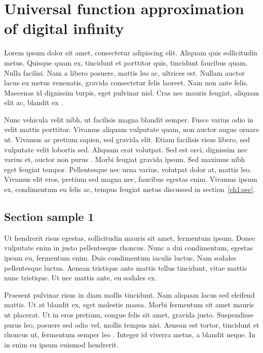 \chapter{Universal function approximation of digital infinity}

Lorem ipsum dolor sit amet, consectetur adipiscing elit. Aliquam quis sollicitudin metus. Quisque quam ex, tincidunt et porttitor quis, tincidunt faucibus quam. Nulla facilisi. Nam a libero posuere, mattis leo ac, ultrices est. Nullam auctor lacus eu metus venenatis, gravida consectetur felis laoreet. Nam non ante felis. Maecenas id dignissim turpis, eget pulvinar nisl. Cras nec mauris feugiat, aliquam elit ac, blandit ex \cite{article-full}.

Nunc vehicula velit nibh, ut facilisis magna blandit semper. Fusce varius odio in velit mattis porttitor. Vivamus aliquam vulputate quam, non auctor augue ornare ut. Vivamus ac pretium sapien, sed gravida elit. Etiam facilisis risus libero, sed vulputate velit lobortis sed. Aliquam erat volutpat. Sed est orci, dignissim nec varius et, auctor non purus \cite{proceedings-minimal,phdthesis-full}. Morbi feugiat gravida ipsum. Sed maximus nibh eget feugiat tempor. Pellentesque nec urna varius, volutpat dolor at, mattis leo. Vivamus elit eros, pretium sed magna nec, faucibus egestas enim. Vivamus ipsum ex, condimentum eu felis ac, tempus feugiat metus discussed in section~\ref{ch1:sec}.

\section{Section sample 1}

Ut hendrerit risus egestas, sollicitudin mauris sit amet, fermentum ipsum. Donec vulputate enim in justo pellentesque rhoncus. Nunc a dui condimentum, egestas ipsum eu, fermentum enim. Duis condimentum iaculis luctus. Nam sodales pellentesque luctus. Aenean tristique ante mattis tellus tincidunt, vitae mattis nunc tristique. Ut nec mattis ante, eu sodales ex.

Praesent pulvinar risus in diam mollis tincidunt. Nam aliquam lacus sed eleifend mattis. Ut at blandit ex, eget molestie massa. Morbi fermentum sit amet mauris ut placerat. Ut in eros pretium, congue felis sit amet, gravida justo. Suspendisse purus leo, posuere sed odio vel, mollis tempus nisi. Aenean est tortor, tincidunt et rhoncus ut, fermentum semper leo \cite{book-crossref}. Integer id viverra metus, a blandit neque. In in enim eu ipsum euismod hendrerit.

